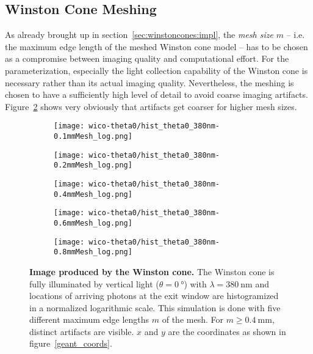\subsection{Winston Cone Meshing}\label{sec:wico_meshing}

As already brought up in section~\ref{sec:winstoncones:impl}, the \textit{mesh size} $m$ -- i.e. the maximum edge length of the meshed Winston cone model -- has to be chosen as a compromise between imaging quality and computational effort. For the \iceact parameterization, especially the light collection capability of the Winston cone is necessary rather than its actual imaging quality. Nevertheless, the meshing is chosen to have a sufficiently high level of detail to avoid coarse imaging artifacts. Figure~\ref{wico:theta0_image} shows very obviously that artifacts get coarser for higher mesh sizes.\\ 

\begin{figure}[H]
	\centering
	\begin{subfigure}[t]{0.495\textwidth}
		\texttt{[image: wico-theta0/hist\_theta0\_380nm-0.1mmMesh\_log.png]}
	\end{subfigure}
	\hfill
	\begin{subfigure}[t]{0.495\textwidth}
		\texttt{[image: wico-theta0/hist\_theta0\_380nm-0.2mmMesh\_log.png]}
	\end{subfigure}
	\vfill
	\begin{subfigure}[t]{0.495\textwidth}
		\texttt{[image: wico-theta0/hist\_theta0\_380nm-0.4mmMesh\_log.png]}
		\label{wico:theta0_image:m04}
	\end{subfigure}
	\hfill
	\begin{subfigure}[t]{0.495\textwidth}
		\texttt{[image: wico-theta0/hist\_theta0\_380nm-0.6mmMesh\_log.png]}
	\end{subfigure}
	\hfill
	\begin{subfigure}[t]{0.495\textwidth}
		\texttt{[image: wico-theta0/hist\_theta0\_380nm-0.8mmMesh\_log.png]}
	\end{subfigure}
	\hfill
	\begin{minipage}[t]{0.495\textwidth}
		\vspace{-190pt}
		\caption[Image produced by the \iceact Winston cone for vertical light]{\textbf{Image produced by the \iceact Winston cone.} The Winston cone is fully illuminated by vertical light ($\theta=\SI{0}{\degree}$) with $\lambda=\SI{380}{\nano\meter}$ and locations of arriving photons at the exit window are histogramized in a normalized logarithmic scale. This simulation is done with five different maximum edge lengths $m$ of the mesh. For $m\geq\SI{0.4}{\milli\meter}$, distinct artifacts are visible. $x$ and $y$ are the \geant coordinates as shown in figure~\ref{geant_coords}.}
		\label{wico:theta0_image}
	\end{minipage}
\end{figure}

